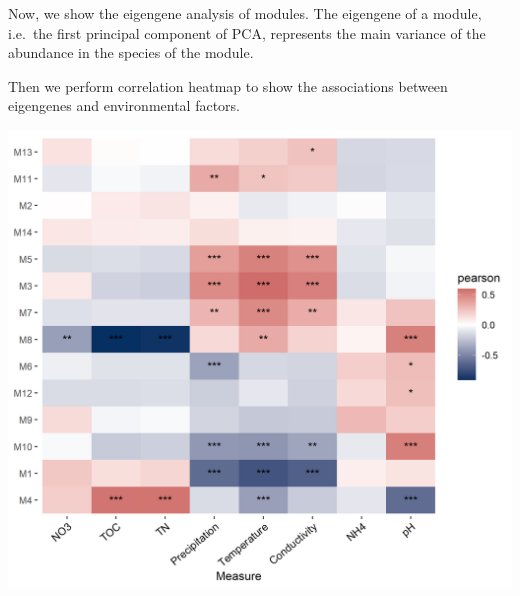 \documentclass[
]{book}
\newenvironment{Shaded}{\begin{snugshade}}{\end{snugshade}}
\newcommand{\AttributeTok}[1]{\textcolor[rgb]{0.77,0.63,0.00}{#1}}
\newcommand{\CommentTok}[1]{\textcolor[rgb]{0.56,0.35,0.01}{\textit{#1}}}
\newcommand{\DecValTok}[1]{\textcolor[rgb]{0.00,0.00,0.81}{#1}}
\newcommand{\FunctionTok}[1]{\textcolor[rgb]{0.00,0.00,0.00}{#1}}
\newcommand{\NormalTok}[1]{#1}
\newcommand{\OtherTok}[1]{\textcolor[rgb]{0.56,0.35,0.01}{#1}}
\newcommand{\SpecialCharTok}[1]{\textcolor[rgb]{0.00,0.00,0.00}{#1}}
\begin{document}
Now, we show the eigengene analysis of modules.
The eigengene of a module, i.e.~the first principal component of PCA, represents the main variance of the abundance in the species of the module.

\begin{Shaded}
\end{Shaded}

Then we perform correlation heatmap to show the associations between eigengenes and environmental factors.

\begin{Shaded}
\end{Shaded}

\begin{center}\includegraphics[width=600px]{Images/Env_module_eigen} \end{center}
\end{document}
